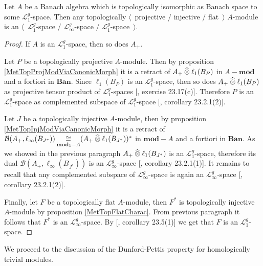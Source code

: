 \begin{proposition}\label{TopProjInjFlatModOverMthscrL1SpCharac} Let $A$ be a Banach algebra which is topologically isomorphic as Banach space to some $\mathscr{L}_1^g$-space. Then any topologically $\langle$~projective / injective / flat~$\rangle$ $A$-module is an $\langle$~$\mathscr{L}_1^g$-space / $\mathscr{L}_\infty^g$-space / $\mathscr{L}_1^g$-space~$\rangle$.
\end{proposition}
\begin{proof} If $A$ is an $\mathscr{L}_1^g$-space, then so does $A_+$. 

Let $P$ be a topologically projective $A$-module. Then by proposition \ref{MetTopProjModViaCanonicMorph} it is a retract of $A_+\mathbin{\widehat{\otimes}} \ell_1(B_P)$ in $A-\mathbf{mod}$ and a fortiori in $\mathbf{Ban}$. Since $\ell_1(B_P)$ is an $\mathscr{L}_1^g$-space, then so does $A_+\mathbin{\widehat{\otimes}}\ell_1(B_P)$ as projective tensor product of $\mathscr{L}_1^g$-spaces [\cite{DefFloTensNorOpId}, exercise 23.17(c)]. Therefore $P$ is an $\mathscr{L}_1^g$-space as complemented subspace of $\mathscr{L}_1^g$-space [\cite{DefFloTensNorOpId}, corollary 23.2.1(2)].

Let $J$ be a topologically injective $A$-module, then by proposition \ref{MetTopInjModViaCanonicMorph} it is a retract of $\mathcal{B}(A_+,\ell_\infty(B_{J^*}))\mathop{\mathbin{\cong}}\limits_{\mathbf{mod}_1-A}(A_+\mathbin{\widehat{\otimes}}\ell_1(B_{J^*}))^*$ in $\mathbf{mod}-A$ and a fortiori in $\mathbf{Ban}$. As we showed in the previous paragraph $A_+\mathbin{\widehat{\otimes}}\ell_1(B_{J^*})$ is an $\mathscr{L}_1^g$-space, therefore its dual $\mathcal{B}(A_+,\ell_\infty(B_{J^*}))$ is an $\mathscr{L}_\infty^g$-space [\cite{DefFloTensNorOpId}, corollary 23.2.1(1)]. It remains to recall that any complemented subspace of $\mathscr{L}_\infty^g$-space is again an $\mathscr{L}_\infty^g$-space [\cite{DefFloTensNorOpId}, corollary 23.2.1(2)].

Finally, let $F$ be a topologically flat $A$-module, then $F^*$ is topologically injective $A$-module by proposition \ref{MetTopFlatCharac}. From previous paragraph it follows that $F^*$ is an $\mathscr{L}_\infty^g$-space. By [\cite{DefFloTensNorOpId}, corollary 23.5(1)] we get that $F$ is an $\mathscr{L}_1^g$-space.
\end{proof}

We proceed to the discussion of the Dunford-Pettis property for homologically trivial modules.   

